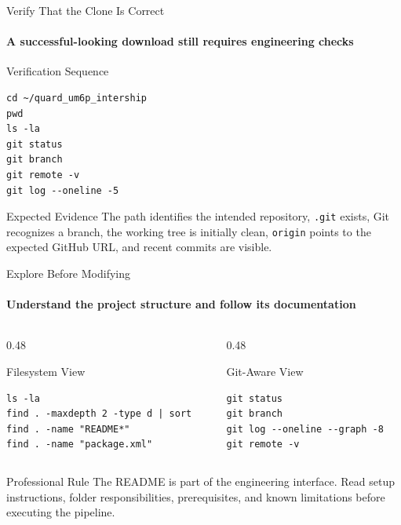 \begin{frame}[fragile]{Verify That the Clone Is Correct}
\framesubtitle{A successful-looking download still requires engineering checks}
\footnotesize
\begin{exampleblock}{Verification Sequence}
\begin{verbatim}
cd ~/quard_um6p_intership
pwd
ls -la
git status
git branch
git remote -v
git log --oneline -5
\end{verbatim}
\end{exampleblock}
\begin{block}{Expected Evidence}
The path identifies the intended repository, \texttt{.git} exists, Git recognizes a branch, the working tree is initially clean, \texttt{origin} points to the expected GitHub URL, and recent commits are visible.
\end{block}
\end{frame}

\begin{frame}[fragile]{Explore Before Modifying}
\framesubtitle{Understand the project structure and follow its documentation}
\footnotesize
\begin{columns}[T,onlytextwidth]
\begin{column}{0.48\textwidth}
\begin{block}{Filesystem View}
\begin{verbatim}
ls -la
find . -maxdepth 2 -type d | sort
find . -name "README*"
find . -name "package.xml"
\end{verbatim}
\end{block}
\end{column}
\begin{column}{0.48\textwidth}
\begin{exampleblock}{Git-Aware View}
\begin{verbatim}
git status
git branch
git log --oneline --graph -8
git remote -v
\end{verbatim}
\end{exampleblock}
\end{column}
\end{columns}
\begin{alertblock}{Professional Rule}
The README is part of the engineering interface. Read setup instructions, folder responsibilities, prerequisites, and known limitations before executing the pipeline.
\end{alertblock}
\end{frame}

